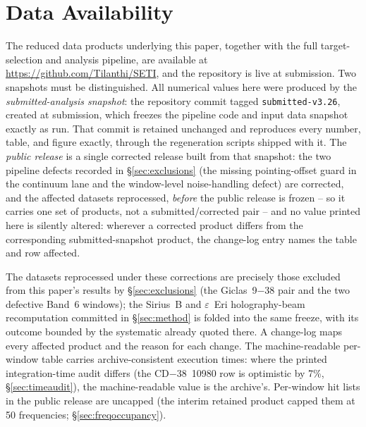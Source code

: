 \documentclass{openjournal}
\begin{document}
\section*{Data Availability}
The reduced data products underlying this paper, together with the
full target-selection and analysis pipeline, are available at
\url{https://github.com/Tilanthi/SETI}, and the repository is live at
submission. Two snapshots must be distinguished. All numerical values
here were produced by the \emph{submitted-analysis snapshot}: the
repository commit tagged \texttt{submitted-v3.26}, created at
submission, which freezes the pipeline code and input data snapshot
exactly as run. That commit is retained unchanged and reproduces
every number, table, and figure exactly, through the regeneration
scripts shipped with it. The \emph{public release} is a single
corrected release built from that snapshot: the two pipeline defects
recorded in \S\ref{sec:exclusions} (the missing pointing-offset guard
in the continuum lane and the window-level noise-handling defect) are
corrected, and the affected datasets reprocessed, \emph{before} the
public release is frozen -- so it carries one set of products, not a
submitted/corrected pair -- and no value printed here is silently
altered: wherever a corrected product differs from the corresponding
submitted-snapshot product, the change-log entry names the table and
row affected.

The datasets reprocessed under these corrections are precisely those
excluded from this paper's results by \S\ref{sec:exclusions} (the
Giclas~9$-$38 pair and the two defective Band~6 windows); the
Sirius~B and $\varepsilon$~Eri holography-beam recomputation
committed in \S\ref{sec:method} is folded into the same freeze, with
its outcome bounded by the systematic already quoted there. A
change-log maps every affected product and the reason for each
change. The machine-readable per-window table carries
archive-consistent execution times: where the printed
integration-time audit differs (the CD$-$38~10980 row is optimistic
by 7\%, \S\ref{sec:timeaudit}), the machine-readable value is the
archive's. Per-window hit lists in the public release are uncapped
(the interim retained product capped them at 50 frequencies;
\S\ref{sec:freqoccupancy}).
\end{document}
